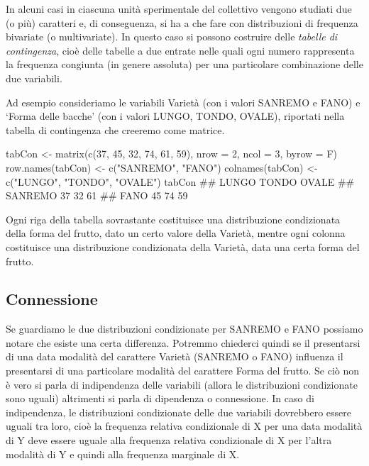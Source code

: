 \documentclass[a4paper,12pt,oneside]{book}
\newenvironment{Shaded}{}{}
\newcommand{\KeywordTok}[1]{#1}
\newcommand{\DataTypeTok}[1]{#1}
\newcommand{\DecValTok}[1]{#1}
\newcommand{\StringTok}[1]{#1}
\newcommand{\CommentTok}[1]{#1}
\newcommand{\NormalTok}[1]{#1}
\begin{document}
In alcuni casi in ciascuna unità sperimentale del collettivo vengono studiati due (o più) caratteri e, di conseguenza, si ha a che fare con distribuzioni di frequenza bivariate (o multivariate). In questo caso si possono costruire delle \emph{tabelle di contingenza}, cioè delle tabelle a due entrate nelle quali ogni numero rappresenta la frequenza congiunta (in genere assoluta) per una particolare combinazione delle due variabili.

Ad esempio consideriamo le variabili Varietà (con i valori SANREMO e FANO) e `Forma delle bacche' (con i valori LUNGO, TONDO, OVALE), riportati nella tabella di contingenza che creeremo come matrice.

\begin{Shaded}
\begin{Highlighting}[]
\NormalTok{tabCon <-}\StringTok{ }\KeywordTok{matrix}\NormalTok{(}\KeywordTok{c}\NormalTok{(}\DecValTok{37}\NormalTok{, }\DecValTok{45}\NormalTok{, }\DecValTok{32}\NormalTok{, }\DecValTok{74}\NormalTok{, }\DecValTok{61}\NormalTok{, }\DecValTok{59}\NormalTok{), }\DataTypeTok{nrow =} \DecValTok{2}\NormalTok{, }\DataTypeTok{ncol =} \DecValTok{3}\NormalTok{,}
                 \DataTypeTok{byrow =}\NormalTok{ F)}
\KeywordTok{row.names}\NormalTok{(tabCon) <-}\StringTok{ }\KeywordTok{c}\NormalTok{(}\StringTok{"SANREMO"}\NormalTok{, }\StringTok{"FANO"}\NormalTok{)}
\KeywordTok{colnames}\NormalTok{(tabCon) <-}\StringTok{ }\KeywordTok{c}\NormalTok{(}\StringTok{"LUNGO"}\NormalTok{, }\StringTok{"TONDO"}\NormalTok{, }\StringTok{"OVALE"}\NormalTok{)}
\NormalTok{tabCon}
\CommentTok{##         LUNGO TONDO OVALE}
\CommentTok{## SANREMO    37    32    61}
\CommentTok{## FANO       45    74    59}
\end{Highlighting}
\end{Shaded}

Ogni riga della tabella sovrastante costituisce una distribuzione condizionata della forma del frutto, dato un certo valore della Varietà, mentre ogni colonna costituisce una distribuzione condizionata della Varietà, data una certa forma del frutto.

\hypertarget{connessione}{%
\subsection*{Connessione}\label{connessione}}

Se guardiamo le due distribuzioni condizionate per SANREMO e FANO possiamo notare che esiste una certa differenza. Potremmo chiederci quindi se il presentarsi di una data modalità del carattere Varietà (SANREMO o FANO) influenza il presentarsi di una particolare modalità del carattere Forma del frutto. Se ciò non è vero si parla di indipendenza delle variabili (allora le distribuzioni condizionate sono uguali) altrimenti si parla di dipendenza o connessione. In caso di indipendenza, le distribuzioni condizionate delle due variabili dovrebbero essere uguali tra loro, cioè la frequenza relativa condizionale di X per una data modalità di Y deve essere uguale alla frequenza relativa condizionale di X per l'altra modalità di Y e quindi alla frequenza marginale di X.
\end{document}

